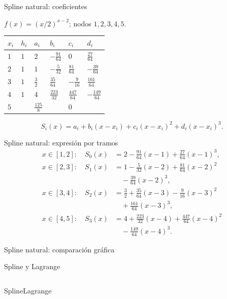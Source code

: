 \documentclass[original_version/main.tex]{subfiles}
\begin{document}
\begin{frame}[t]{Spline natural: coeficientes}
\par\noindent\begin{minipage}[t][9mm][t]{\textwidth}\small\strut $f(x)=(x/2)^{x-2}$; nodos $1,2,3,4,5$.\end{minipage}\par\nointerlineskip
\begin{minipage}[t]{\textwidth}\begingroup\scriptsize\setlength{\tabcolsep}{2pt}\begin{center}\begin{tabular}{|C{.12\textwidth}|C{.12\textwidth}|C{.12\textwidth}|C{.12\textwidth}|C{.12\textwidth}|C{.12\textwidth}|}\hline
\rule[-2mm]{0pt}{6mm}$x_i$&$h_i$&$a_i$&$b_i$&$c_i$&$d_i$\\\hline
\rule[-2.5mm]{0pt}{8mm}$1$&$1$&$2$&$-\frac{91}{64}$&$0$&$\frac{27}{64}$\\\hline
\rule[-2.5mm]{0pt}{8mm}$2$&$1$&$1$&$-\frac{5}{32}$&$\frac{81}{64}$&$-\frac{39}{64}$\\\hline
\rule[-2.5mm]{0pt}{8mm}$3$&$1$&$\frac{3}{2}$&$\frac{35}{64}$&$-\frac{9}{16}$&$\frac{161}{64}$\\\hline
\rule[-2.5mm]{0pt}{8mm}$4$&$1$&$4$&$\frac{223}{32}$&$\frac{447}{64}$&$-\frac{149}{64}$\\\hline
\rule[-2.5mm]{0pt}{8mm}$5$&&$\frac{125}{8}$&&$0$&\\\hline
\end{tabular}\end{center}\endgroup\end{minipage}\par
\[S_i(x)=a_i+b_i(x-x_i)+c_i(x-x_i)^2+d_i(x-x_i)^3.\]
\end{frame}
\begin{frame}[t]{Spline natural: expresión por tramos}
\small
\begin{align*}
x\in[1,2]:\quad S_0(x)&=2-\tfrac{91}{64}(x-1)+\tfrac{27}{64}(x-1)^3,\\[3mm]
x\in[2,3]:\quad S_1(x)&=1-\tfrac5{32}(x-2)+\tfrac{81}{64}(x-2)^2\\
&\quad-\tfrac{39}{64}(x-2)^3,\\[3mm]
x\in[3,4]:\quad S_2(x)&=\tfrac32+\tfrac{35}{64}(x-3)-\tfrac9{16}(x-3)^2\\
&\quad+\tfrac{161}{64}(x-3)^3,\\[3mm]
x\in[4,5]:\quad S_3(x)&=4+\tfrac{223}{32}(x-4)+\tfrac{447}{64}(x-4)^2\\
&\quad-\tfrac{149}{64}(x-4)^3.
\end{align*}
\end{frame}
\begin{frame}[t]{Spline natural: comparación gráfica}
\end{frame}
\begin{frame}[t]{Spline y Lagrange}
\begin{columns}\centering Spline\centering Lagrange\end{columns}
\end{frame}
\end{document}
